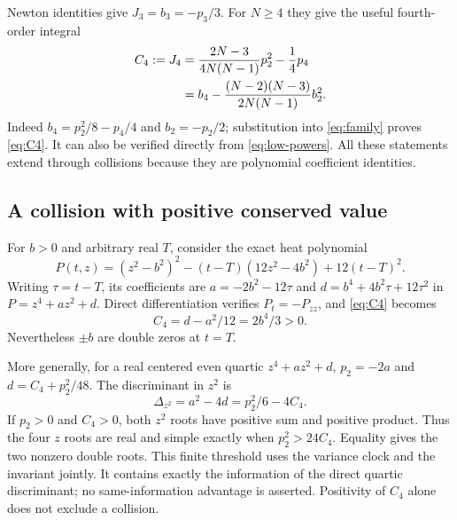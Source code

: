 Newton identities give $J_3=b_3=-p_3/3$. For $N\ge4$ they give
the useful fourth-order integral
\begin{align}
 C_4:=J_4
 &=\frac{2N-3}{4N(N-1)}p_2^2-\frac14p_4 \label{eq:C4}\\
 &=b_4-\frac{(N-2)(N-3)}{2N(N-1)}b_2^2.
 \notag
\end{align}
Indeed $b_4=p_2^2/8-p_4/4$ and $b_2=-p_2/2$; substitution into
\eqref{eq:family} proves \eqref{eq:C4}. It can also be verified
directly from \eqref{eq:low-powers}. All these statements extend
through collisions because they are polynomial coefficient identities.

\subsection{A collision with positive conserved value}
For $b>0$ and arbitrary real $T$, consider the exact heat polynomial
\begin{equation}
 P(t,z)=(z^2-b^2)^2-(t-T)(12z^2-4b^2)+12(t-T)^2.
 \label{eq:quartic-control}
\end{equation}
Writing $\tau=t-T$, its coefficients are
$a=-2b^2-12\tau$ and $d=b^4+4b^2\tau+12\tau^2$ in
$P=z^4+az^2+d$. Direct differentiation verifies $P_t=-P_{zz}$,
and \eqref{eq:C4} becomes
\begin{equation}
 C_4=d-a^2/12=2b^4/3>0.
 \label{eq:positive-collision}
\end{equation}
Nevertheless $\pm b$ are double zeros at $t=T$.

More generally, for a real centered even quartic $z^4+az^2+d$,
$p_2=-2a$ and $d=C_4+p_2^2/48$. The discriminant in $z^2$ is
\begin{equation}
 \Delta_{z^2}=a^2-4d=p_2^2/6-4C_4.
 \label{eq:quartic-discriminant}
\end{equation}
If $p_2>0$ and $C_4>0$, both $z^2$ roots have positive sum and
positive product. Thus the four $z$ roots are real and simple exactly
when $p_2^2>24C_4$. Equality gives the two nonzero double roots.
This finite threshold uses the variance clock and the invariant jointly.
It contains exactly the information of the direct quartic discriminant;
no same-information advantage is asserted. Positivity of $C_4$ alone
does not exclude a collision.

